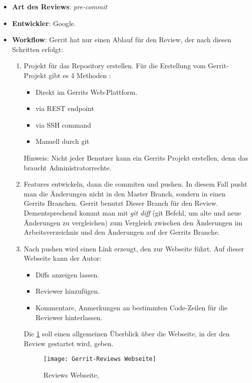 \begin{itemize}
	\item \textbf{Art des Reviews}: \textit{pre-commit}
	\item \textbf{Entwickler}: Google.
	\item \textbf{Workflow}: Gerrit hat nur einen Ablauf für den Review, der nach diesen Schritten erfolgt:
		\begin{enumerate}
			\item Projekt für das Repository erstellen. Für die Erstellung vom Gerrit-Projekt gibt es 4 Methoden :
			\begin{itemize}
				\item Direkt im Gerrits Web-Plattform.
				\item via REST endpoint
				\item via SSH command
				\item Manuell durch git
			\end{itemize}
			Hinweis: Nicht jeder Benutzer kann ein Gerrits Projekt erstellen, denn das braucht Administratorrechte.		
			
			\item Features entwickeln, dann die commiten und pushen. In diesem Fall pusht man die Änderungen nicht in den Master Branch, sondern in einen Gerrits Branchen.
				Gerrit benutzt Dieser Branch für den Review. Dementsprechend kommt man mit \textit{git diff} (git Befehl, um alte und neue Änderungen zu vergleichen) zum Vergleich
				zwischen den Änderungen im Arbeitsverzeichnis und den Änderungen auf der Gerrits Branche.
			\item Nach pushen wird einen Link erzeugt, den zur Webseite führt. Auf dieser Webseite kann der Autor: 
			\begin{itemize}
				\item Diffs anzeigen lassen.
				\item Reviewer hinzufügen.
				\item Kommentare, Anmerkungen an bestimmten Code-Zeilen für die Reviewer hinterlassen.
			\end{itemize}
			Die \cref{fig:Gerrit-Reviews Webseite} soll einen allgemeinen Überblick über die Webseite, in der den Review gestartet wird, geben.
			
			\begin{figure}[H]
				\centering
				\texttt{[image: Gerrit-Reviews Webseite]}
				\caption[Gerrit: Reviews Webseite]{Reviews Webseite,\\ \cite{Gerrit}}
				\label{fig:Gerrit-Reviews Webseite}
			\end{figure}
			

\end{enumerate}
\end{itemize}
